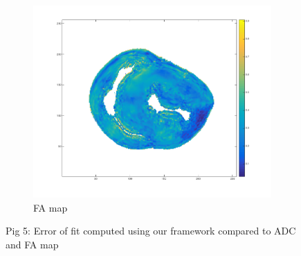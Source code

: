 \begin{figure}
\begin{subfigure}{.31\textwidth}
        \includegraphics[width=\textwidth]{figures/pig5_fa_22}
        \caption{FA map}
        \label{fig:pig5_fa}
    \end{subfigure}
    \caption{Pig 5: Error of fit computed using our framework compared to ADC and FA map}
    \label{fig:pig5}
\end{figure}

